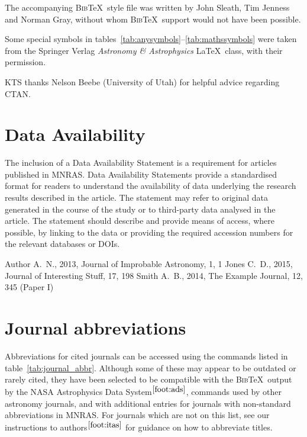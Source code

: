 \documentclass[fleqn,usenatbib,useAMS]{mnras}
\newcommand{\bibtex}{\textsc{Bib}\!\TeX} %
\begin{document}
The accompanying \bibtex\ style file was written by John Sleath, Tim Jenness and Norman Gray, without whom \bibtex\ support would not have been possible.

Some special symbols in tables~\ref{tab:anysymbols}--\ref{tab:mathssymbols} were taken from the Springer Verlag \textit{Astronomy \& Astrophysics} \LaTeX\ class, with their permission.

KTS thanks Nelson Beebe (University of Utah) for helpful advice regarding CTAN.


\section*{Data Availability}

 
The inclusion of a Data Availability Statement is a requirement for articles published in MNRAS. Data Availability Statements provide a standardised format for readers to understand the availability of data underlying the research results described in the article. The statement may refer to original data generated in the course of the study or to third-party data analysed in the article. The statement should describe and provide means of access, where possible, by linking to the data or providing the required accession numbers for the relevant databases or DOIs.




%


\begin{thebibliography}{99}
Author A.~N., 2013, Journal of Improbable Astronomy, 1, 1
Jones C.~D., 2015, Journal of Interesting Stuff, 17, 198
Smith A.~B., 2014, The Example Journal, 12, 345 (Paper I)
\end{thebibliography}




\appendix
\section{Journal abbreviations}
\label{sec:abbreviations}
Abbreviations for cited journals can be accessed using the commands listed in table~\ref{tab:journal_abbr}.
Although some of these may appear to be outdated or rarely cited, they have been selected to be compatible with the \bibtex\ output by the NASA Astrophysics Data System$^{\ref{foot:ads}}$, commands used by other astronomy journals, and with additional entries for journals with non-standard abbreviations in MNRAS.
For journals which are not on this list, see our instructions to authors$^{\ref{foot:itas}}$ for guidance on how to abbreviate titles.
\end{document}
